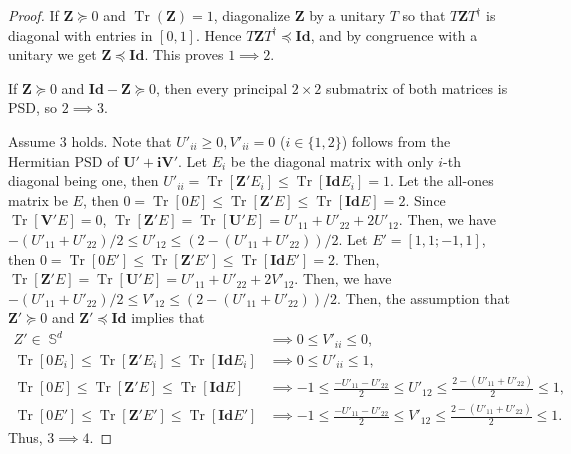 \documentclass[10pt,a4paper]{amsart}
\DeclareMathOperator{\herm}{\mathbb{S}}
\DeclareMathOperator{\tr}{Tr}
\newcommand{\Id}{\mathbf{Id}}
\newcommand{\U}{\mathbf{U}}
\newcommand{\V}{\mathbf{V}}
\newcommand{\Z}{\mathbf{Z}}
\newcommand{\vi}{\mathbf{i}}
\begin{document}
\begin{proof}
If $\Z\succeq0$ and $\tr(\Z)=1$, diagonalize $\Z$ by a unitary $T$ so that $T\Z T^\dagger$ is diagonal with entries in $[0,1]$. Hence $T\Z T^\dagger \preceq \Id$, and by congruence with a unitary we get $\Z \preceq \Id$. This proves $1\!\implies\!2$.

If $\Z \succeq 0$ and $\Id-\Z\succeq0$, then every principal $2\times2$ submatrix of both matrices is PSD, so $2\!\implies\!3$.

Assume $3$ holds.  Note that  $U'_{ii} \ge 0, V'_{ii} = 0$ ($i \in \{1,2\}$) follows from the Hermitian PSD of $\U'+\vi \V'$. Let $E_i$ be the diagonal matrix with only $i$-th diagonal being one, then $ U'_{ii} = \tr[\Z' E_i ] \le \tr[\Id E_i] = 1$. Let the all-ones matrix be $E$, then $0  = \tr[0  E] \le  \tr[\Z' E]   \le \tr[\Id  E]  =  2 $. Since $\tr[\V'  E] = 0$, $ \tr[\Z' E]   = \tr[\U' E]   =  U'_{11} + U'_{22} + 2 U'_{12}  $. Then, we have $-(U'_{11} + U'_{22}) /2 \le   U'_{12} \le (2 - (U'_{11} + U'_{22}))/2$. Let  $E'=[1, 1; -1, 1]$, then $0  = \tr[0  E'] \le  \tr[\Z' E']   \le \tr[\Id  E']  =  2 $. Then, $ \tr[\Z' E]   = \tr[\U' E]   =  U'_{11} + U'_{22} + 2 V'_{12}  $. Then, we have $-(U'_{11} + U'_{22}) /2 \le   V'_{12} \le (2 - (U'_{11} + U'_{22}))/2$. Then, the assumption that $\Z' \succeq 0$ and $\Z' \preceq \Id$ implies that
    \begin{equation}
    \label{eq.implieq}
            \begin{split}
            Z' \in \herm^d & \implies 0 \le V'_{ii} \le 0, \\
                \tr[0  E_i] \le \tr[\Z' E_i]   \le   \tr[\Id  E_i]  & \implies   0 \le   U'_{ii} \le 1, \\
    \tr[0  E] \le \tr[\Z' E]   \le   \tr[\Id  E]  & \implies  -1 \le  \frac{-U'_{11} - U'_{22}}{2} \le   U'_{12} \le \frac{2 - (U'_{11} + U'_{22})}{2} \le 1, \\
  \tr[0  E'] \le \tr[\Z' E']   \le \tr[\Id  E']   & \implies -1 \le \frac{-U'_{11} - U'_{22}}{2} \le   V'_{12} \le \frac{2 - (U'_{11} + U'_{22})}{2}  \le 1.
    \end{split}
    \end{equation}
     Thus, $3 \implies 4$.
\end{proof}
\end{document}

